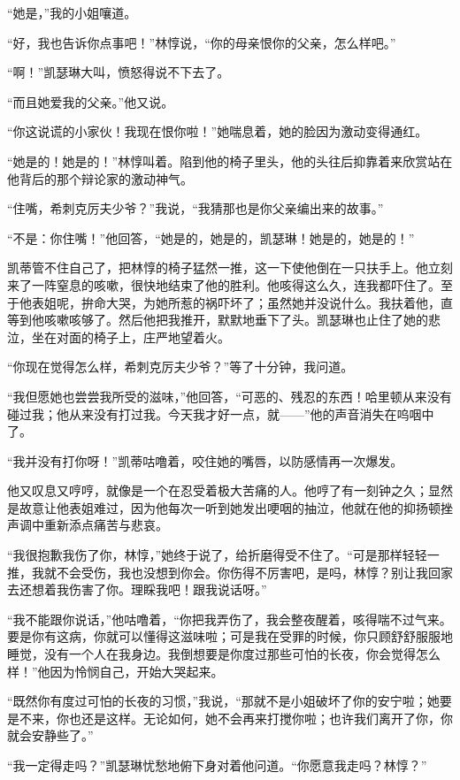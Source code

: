 \par “她是，”我的小姐嚷道。
\par “好，我也告诉你点事吧！”林惇说，“你的母亲恨你的父亲，怎么样吧。”
\par “啊！”凯瑟琳大叫，愤怒得说不下去了。
\par “而且她爱我的父亲。”他又说。
\par “你这说谎的小家伙！我现在恨你啦！”她喘息着，她的脸因为激动变得通红。
\par “她是的！她是的！”林惇叫着。陷到他的椅子里头，他的头往后抑靠着来欣赏站在他背后的那个辩论家的激动神气。
\par “住嘴，希刺克厉夫少爷？”我说，“我猜那也是你父亲编出来的故事。”
\par “不是：你住嘴！”他回答，“她是的，她是的，凯瑟琳！她是的，她是的！”
\par 凯蒂管不住自己了，把林惇的椅子猛然一推，这一下使他倒在一只扶手上。他立刻来了一阵窒息的咳嗽，很快地结束了他的胜利。他咳得这么久，连我都吓住了。至于他表姐呢，拚命大哭，为她所惹的祸吓坏了；虽然她并没说什么。我扶着他，直等到他咳嗽咳够了。然后他把我推开，默默地垂下了头。凯瑟琳也止住了她的悲泣，坐在对面的椅子上，庄严地望着火。
\par “你现在觉得怎么样，希刺克厉夫少爷？”等了十分钟，我问道。
\par “我但愿她也尝尝我所受的滋味，”他回答，“可恶的、残忍的东西！哈里顿从来没有碰过我；他从来没有打过我。今天我才好一点，就——”他的声音消失在呜咽中了。
\par “我并没有打你呀！”凯蒂咕噜着，咬住她的嘴唇，以防感情再一次爆发。
\par 他又叹息又哼哼，就像是一个在忍受着极大苦痛的人。他哼了有一刻钟之久；显然是故意让他表姐难过，因为他每次一听到她发出哽咽的抽泣，他就在他的抑扬顿挫声调中重新添点痛苦与悲哀。
\par “我很抱歉我伤了你，林惇，”她终于说了，给折磨得受不住了。“可是那样轻轻一推，我就不会受伤，我也没想到你会。你伤得不厉害吧，是吗，林惇？别让我回家去还想着我伤害了你。理睬我吧！跟我说话呀。”
\par “我不能跟你说话，”他咕噜着，“你把我弄伤了，我会整夜醒着，咳得喘不过气来。要是你有这病，你就可以懂得这滋味啦；可是我在受罪的时候，你只顾舒舒服服地睡觉，没有一个人在我身边。我倒想要是你度过那些可怕的长夜，你会觉得怎么样！”他因为怜悯自己，开始大哭起来。
\par “既然你有度过可怕的长夜的习惯，”我说，“那就不是小姐破坏了你的安宁啦；她要是不来，你也还是这样。无论如何，她不会再来打搅你啦；也许我们离开了你，你就会安静些了。”
\par “我一定得走吗？”凯瑟琳忧愁地俯下身对着他问道。“你愿意我走吗？林惇？”
